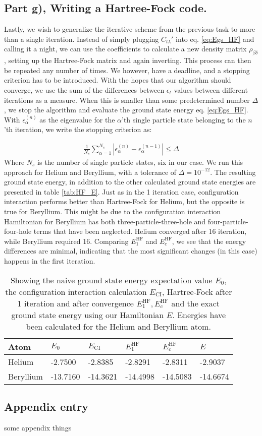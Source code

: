 \documentclass{article}
\newcommand{\hafo}[1]{#1^{\text{HF}}}
\begin{document}
\subsection*{Part g), Writing a Hartree-Fock code.}
    Lastly, we wish to generalize the iterative scheme from  the previous task to more than a single iteration. Instead of simply plugging $C_{t\lambda}'$ into eq. \eqref{eq:Egs_HF} and calling it a night, we can use the coefficients to calculate a new density matrix $\rho_{\beta\delta}$, setting up the Hartree-Fock matrix and again inverting. This process can then be repeated any number of times. We however, have a deadline, and a stopping criterion has to be introduced. With the hopes that our algorithm should converge, we use the sum of the differences between $\epsilon_t$ values between different iterations as a measure. When this is smaller than some predetermined number $\Delta$, we stop the algorithm and evaluate the ground state energy eq. \eqref{eq:Egs_HF}. With $\epsilon_\alpha^{(n)}$ as the eigenvalue for the $\alpha$'th single particle state belonging to the $n$'th iteration, we write the stopping criterion as:
    
    \begin{align*}
        \frac{1}{N_s}\sum_{\alpha=1}^{N_s} |\epsilon_\alpha^{(n)}-\epsilon_\alpha^{(n-1)}| \leq \Delta
    \end{align*}
    Where $N_s$ is the number of single particle states, six in our case. We run this approach for Helium and Beryllium, with a tolerance of $\Delta = 10^{-12}$. The resulting ground state energy, in addition to the other calculated ground state energies are presented in table \ref{tab:HF_E}. Just as in the 1 iteration case, configuration interaction performs better than Hartree-Fock for Helium, but the opposite is true for Beryllium. This might be due to the configuration interaction Hamiltonian for Beryllium has both three-particle-three-hole and four-particle-four-hole terms that have been neglected. Helium converged after 16 iteration, while Beryllium required 16. Comparing $\hafo{E_1}$ and $\hafo{E_c}$, we see that the energy differences are minimal, indicating that the most significant changes (in this case) happens in the first iteration. 

    \begin{table}[H]
        \centering
        \begin{tabular}{l|l|l|l|l|l}
        Atom      & $E_0$ & $E_{\text{CI}}$ & $\hafo{E_1}$ & $\hafo{E_c}$ & $E$ \\
        \hline
        Helium    & -2.7500     & -2.8385    & -2.8291 & -2.8311  & -2.9037    \\
        Beryllium & -13.7160     & -14.3621    & -14.4998 & -14.5083  &   -14.6674 
        \end{tabular}
        \caption{Showing the naive ground state energy expectation value $E_0$, the configuration interaction calculation $E_{\text{CI}}$, Hartree-Fock after 1 iteration and after convergence $\hafo{E_1}, \hafo{E_c}$ and the exact ground state energy using our Hamiltonian $E$. Energies have been calculated for the Helium and Beryllium atom. } \label{tab:ALL_E}
    \end{table}

\begin{appendix}
    \section{Appendix entry}
    some appendix things
\end{appendix}
\cite{DFTgap}
\printbibliography
\end{document}
